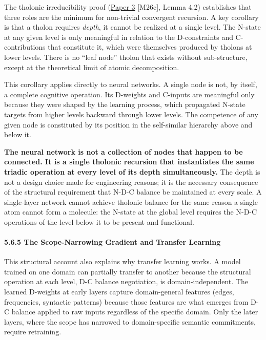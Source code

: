 \documentclass[12pt]{article}
\begin{document}
The tholonic irreducibility proof
(\href{https://github.com/baardev/truevalue/blob/main/docnav/Research/papers/3_minimal-recursive-triadic-framework/3_minimal-recursive-triadic-framework.pdf}{Paper
3} {[}M26c{]}, Lemma 4.2) establishes that three roles are the minimum
for non-trivial convergent recursion. A key corollary is that a tholon
requires \emph{depth}, it cannot be realized at a single level. The
N-state at any given level is only meaningful in relation to the
D-constraints and C-contributions that constitute it, which were
themselves produced by tholons at lower levels. There is no ``leaf
node'' tholon that exists without sub-structure, except at the
theoretical limit of atomic decomposition.

This corollary applies directly to neural networks. A single node is
not, by itself, a complete cognitive operation. Its D-weights and
C-inputs are meaningful only because they were shaped by the learning
process, which propagated N-state targets from higher levels backward
through lower levels. The competence of any given node is constituted by
its position in the self-similar hierarchy above and below it.

\textbf{The neural network is not a collection of nodes that happen to
be connected. It is a single tholonic recursion that instantiates the
same triadic operation at every level of its depth simultaneously.} The
depth is not a design choice made for engineering reasons; it is the
necessary consequence of the structural requirement that N-D-C balance
be maintained at every scale. A single-layer network cannot achieve
tholonic balance for the same reason a single atom cannot form a
molecule: the N-state at the global level requires the N-D-C operations
of the level below it to be present and functional.

\paragraph{5.6.5 The Scope-Narrowing Gradient and Transfer
Learning}\label{the-scope-narrowing-gradient-and-transfer-learning}

This structural account also explains why transfer learning works. A
model trained on one domain can partially transfer to another because
the structural operation at each level, D-C balance negotiation, is
domain-independent. The learned D-weights at early layers capture
domain-general features (edges, frequencies, syntactic patterns) because
those features are what emerges from D-C balance applied to raw inputs
regardless of the specific domain. Only the later layers, where the
scope has narrowed to domain-specific semantic commitments, require
retraining.
\end{document}
